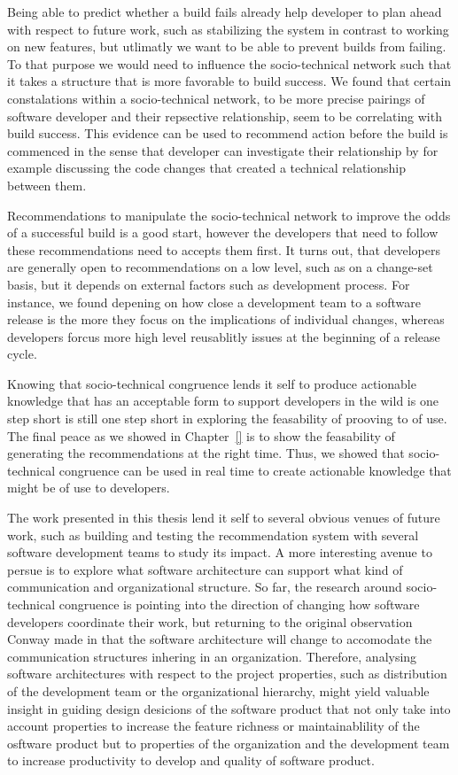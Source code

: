 Being able to predict whether a build fails already help developer to plan ahead with respect to future work, such as stabilizing the system in contrast to working on new features, but utlimatly we want to be able to prevent builds from failing.
To that purpose we would need to influence the socio-technical network such that it takes a structure that is more favorable to build success.
We found that certain constalations within a socio-technical network, to be more precise pairings of software developer and their repsective relationship, seem to be correlating with build success.
This evidence can be used to recommend action before the build is commenced in the sense that developer can investigate their relationship by for example discussing the code changes that created a technical relationship between them.

Recommendations to manipulate the socio-technical network to improve the odds of a successful build is a good start, however the developers that need to follow these recommendations need to accepts them first.
It turns out, that developers are generally open to recommendations on a low level, such as on a change-set basis, but it depends on external factors such as development process.
For instance, we found depening on how close a development team to a software release is the more they focus on the implications of individual changes, whereas developers forcus more high level reusablitly issues at the beginning of a release cycle.

Knowing that socio-technical congruence lends it self to produce actionable knowledge that has an acceptable form to support developers in the wild is one step short is still one step short in exploring the feasability of prooving to of use.
The final peace as we showed in Chapter~\ref{} is to show the feasability of generating the recommendations at the right time.
Thus, we showed that socio-technical congruence can be used in real time to create actionable knowledge that might be of use to developers.

The work presented in this thesis lend it self to several obvious venues of future work, such as building and testing the recommendation system with several software development teams to study its impact.
A more interesting avenue to persue is to explore what software architecture can support what kind of communication and organizational structure.
So far, the research around socio-technical congruence is pointing into the direction of changing how software developers coordinate their work, but returning to the original observation Conway made in that the software architecture will change to accomodate the communication structures inhering in an organization.
Therefore, analysing software architectures with respect to the project properties, such as distribution of the development team or the organizational hierarchy, might yield valuable insight in guiding design desicions of the software product that not only take into account properties to increase the feature richness or maintainablility of the osftware product but to properties of the organization and the development team to increase productivity to develop and quality of software product. 
